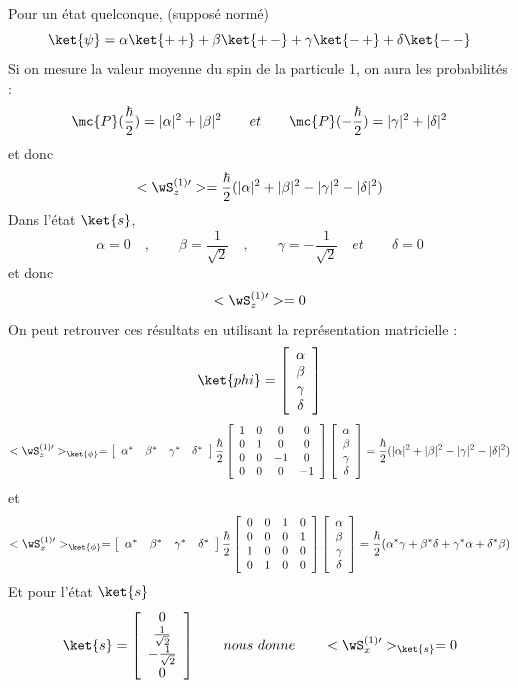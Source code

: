 Pour un état quelconque, (supposé normé)
\[
\ket{\psi} = \alpha\ket{+\,+}+\beta\ket{+\,-}+\gamma\ket{-\,+}+\delta\ket{-\,-}
\]
Si on mesure la valeur moyenne du spin de la particule 1, on aura les
probabilités :
\[
\mc{P}(\frac{\hbar}{2}) = |\alpha|^2+|\beta|^2 \qquad et
\qquad \mc{P}(-\frac{\hbar}{2}) = |\gamma|^2+|\delta|^2
\]
et donc
\[
<\wS_z^{(1)\prime}>=\frac{\hbar}{2}(|\alpha|^2+|\beta|^2-|\gamma|^2-|\delta|^2)
\]
Dans l'état $\ket{s}$, 
\[
\alpha=0\quad,\qquad\beta=\frac{1}{\sqrt{2}}\quad,\qquad
\gamma=-\frac{1}{\sqrt{2}}\quad et\qquad\delta=0
\]
et donc
\[
<\wS_z^{(1)\prime}>=0
\]
On peut retrouver ces résultats en utilisant la représentation matricielle :
\[
\ket{phi}=\left[\begin{array}{ c }
 \alpha \\ \beta \\ \gamma \\ \delta \\
\end{array}\right]
\]
\[
<\wS_z^{(1)\prime}>_{\ket{\phi}}=
\left[\begin{array}{ c c c c }
 \alpha^* & \beta^* & \gamma^* & \delta^* \\
\end{array}\right]
\frac{\hbar}{2}\left[\begin{array}{ c c c c }
 1 & 0 & 0 & 0 \\
 0 & 1 & 0 & 0 \\
 0 & 0 & -1 & 0 \\
 0 & 0 & 0 & -1 \\
\end{array}\right]\left[\begin{array}{ c }
 \alpha \\ \beta \\ \gamma \\ \delta \\
\end{array}\right]
=\frac{\hbar}{2}(|\alpha|^2+|\beta|^2-|\gamma|^2-|\delta|^2)
\]
et
\[
<\wS_x^{(1)\prime}>_{\ket{\phi}}=
\left[\begin{array}{ c c c c }
 \alpha^* & \beta^* & \gamma^* & \delta^* \\
\end{array}\right]
\frac{\hbar}{2}\left[\begin{array}{ c c c c }
 0 & 0 & 1 & 0 \\
 0 & 0 & 0 & 1 \\
 1 & 0 & 0 & 0 \\
 0 & 1 & 0 & 0 \\
\end{array}\right]\left[\begin{array}{ c }
 \alpha \\ \beta \\ \gamma \\ \delta \\
\end{array}\right]
=\frac{\hbar}{2}(\alpha^*\gamma+\beta^*\delta+\gamma^*\alpha+\delta^*\beta)
\]
Et pour l'état $\ket{s}$
\[
\ket{s}=\left[\begin{array}{ c }
 0 \\ \frac{1}{\sqrt{2}} \\ -\frac{1}{\sqrt{2}} \\ 0 \\
\end{array}\right]
\qquad nous\ donne\qquad<\wS_x^{(1)\prime}>_{\ket{s}}=0
\]


